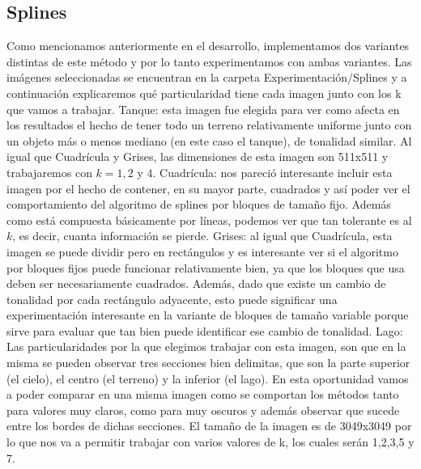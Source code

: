\documentclass[a4paper]{article}
\begin{document}
\subsection{Splines}
Como mencionamos anteriormente en el desarrollo, implementamos dos variantes distintas de este método y por lo tanto experimentamos con ambas variantes. Las imágenes seleccionadas se encuentran en la carpeta Experimentación/Splines y a continuación explicaremos qué particularidad tiene cada imagen junto con los k que vamos a trabajar.
\newline
\newline Tanque: esta imagen fue elegida para ver como afecta en los resultados el hecho de tener todo un terreno relativamente uniforme junto con un objeto más o menos mediano (en este caso el tanque), de tonalidad similar. Al igual que Cuadrícula y Grises, las dimensiones de esta imagen son 511x511 y trabajaremos con $k = 1, 2$ y $4$.
\newline \newline Cuadrícula: nos pareció interesante incluir esta imagen por el hecho de contener, en su mayor parte, cuadrados y así poder ver el comportamiento del algoritmo de splines por bloques de tamaño fijo. Además como está compuesta básicamente por líneas, podemos ver que tan tolerante es al $k$, es decir, cuanta información se pierde.
\newline \newline Grises: al igual que Cuadrícula, esta imagen se puede dividir pero en rectángulos y es interesante ver si el algoritmo por bloques fijos puede funcionar relativamente bien, ya que los bloques que usa deben ser necesariamente cuadrados. Además, dado que existe un cambio de tonalidad por cada rectángulo adyacente, esto puede significar una experimentación interesante en la variante de bloques de tamaño variable porque sirve para evaluar que tan bien puede identificar ese cambio de tonalidad.
\newline \newline Lago: Las particularidades por la que elegimos trabajar con esta imagen, son que en la misma se pueden observar tres secciones bien delimitas, que son la parte superior (el cielo), el centro (el terreno)  y la inferior (el lago). En esta oportunidad vamos a poder comparar en una misma imagen como se comportan los métodos tanto para valores muy claros, como para muy oscuros y además observar que sucede entre los bordes de dichas secciones. 
El tamaño de la imagen es de 3049x3049  por lo que nos va a permitir trabajar con varios valores de k, los cuales serán 1,2,3,5 y 7. 
\end{document}
